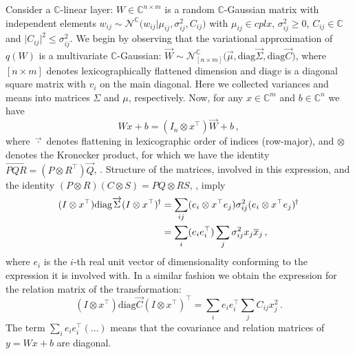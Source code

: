 \documentclass[a4paper,10pt]{article}
\newcommand{\cplx}{\mathbb{C}}
\newcommand{\hop}{{\mkern-1.5mu\dagger}}
\newcommand{\conj}[1]{\overline{#1}}
\renewcommand{\vec}[1]{\overrightarrow{#1}}
\newcommand{\diag}[1]{\mathrm{diag}{#1}}
\begin{document}
Consider a $\cplx$-linear layer: $
  W \in \cplx^{n\times m}
$ is a random $\cplx$-Gaussian matrix with independent elements $
  w_{ij} \sim \mathcal{N}^{\cplx}\bigl(
    w_{ij}
    \big \vert
    \mu_{ij}, \sigma^2_{ij}, C_{ij}
  \bigr)
$ with $\mu_{ij}\in cplx$, $\sigma^2_{ij} \geq 0$, $C_{ij}\in \cplx$ and $
  \lvert C_{ij} \rvert^2 \leq \sigma^2_{ij}
$. We begin by observing that the variational approximation of $q(W)$ is a multivariate
$\cplx$-Gaussian: $
  \vec{W}
    \sim \mathcal{N}^{\cplx}_{[n\times m]} \bigl(
      \vec{\mu}, \diag{\vec{\Sigma}}, \diag{\vec{C}}
    \bigr)
$, where $[n\times m]$ denotes lexicographically flattened dimension and $\diag{v}$ is a
diagonal square matrix with $v_i$ on the main diagonal. Here we collected variances and means
into matrices $\Sigma$ and $\mu$, respectively.
%
Now, for any $x \in \cplx^m$ and $b\in \cplx^n$ we have
$$
W x + b
  = (I_n \otimes x^\top) \vec{W} + b
  \,, $$
where $\vec{\cdot}$ denotes flattening in lexicographic order of indices (row-major), and
$\otimes$ denotes the Kronecker product, for which we have the identity $
  \vec{P Q R} = (P \otimes R^\top) \vec{Q}
$, \cite{petersen_matrix_2012}.
%
Structure of the matrices, involved in this expression, and the identity $
  (P \otimes R) (C \otimes S) = P Q \otimes R S
$, \cite{petersen_matrix_2012}, imply
\begin{align*}
  (I \otimes x^\top) \diag{\vec{\Sigma}} (I \otimes x^\top)^\hop
    &
    = \sum_{ij} (e_i \otimes x^\top e_j)
      \sigma^2_{ij} (e_i \otimes x^\top e_j)^\hop
    \notag \\
    &
    = \sum_i (e_i e_i^\top) \sum_j \sigma^2_{ij} x_j \conj{x}_j
    \,,
\end{align*}
where $e_i$ is the $i$-th real unit vector of dimensionality conforming to the expression it
is involved with. In a similar fashion we obtain the expression for the relation matrix of
the transformation:
\begin{equation*}
  (I \otimes x^\top) \diag{\vec{C}} (I \otimes x^\top)^\top
    = \sum_i e_i e_i^\top \sum_j C_{ij} x_j^2
    \,.
\end{equation*}
The term $
  \sum_i e_i e_i^\top (\ldots)
$ means that the covariance and relation matrices of $y = Wx + b$ are diagonal.
\end{document}
